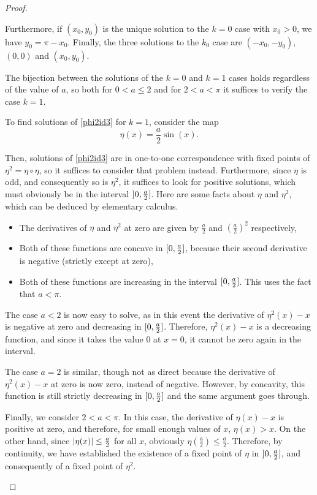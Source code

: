 \begin{proof}
\begin{lemma}
Furthermore, if $(x_0, y_0)$ is the unique solution to the $k=0$ case with $x_0 > 0$, we have $y_0 = \pi - x_0$. Finally, the three solutions to the $k_0$ case are $(-x_0, -y_0)$, $(0,0)$ and $(x_0, y_0)$.
\end{lemma}

\begin{lemmaproof}
The bijection between the solutions of the $k=0$ and $k=1$ cases holds regardless of the value of $a$, so both for $0<a\leq 2$ and for $2<a<\pi$ it suffices to verify the case $k=1$.

To find solutions of \eqref{phi2id3} for $k=1$, consider the map
\begin{equation}
\eta(x) = \frac a 2 \sin(x).
\end{equation}

Then, solutions of \eqref{phi2id3} are in one-to-one correspondence with fixed points of $\eta^2 = \eta \circ \eta$, so it suffices to consider that problem instead. Furthermore, since $\eta$ is odd, and consequently so is $\eta^2$, it suffices to look for positive solutions, which must obviously be in the interval $\linterval 0 {\frac a 2}$. Here are some facts about $\eta$ and $\eta^2$, which can be deduced by elementary calculus.
\begin{itemize}
\item The derivatives of $\eta$ and $\eta^2$ at zero are given by $\frac a 2$ and $\left( \frac a 2 \right)^2$ respectively,
\item Both of these functions are concave in $\interval 0 {\frac a 2}$, because their second derivative is negative (strictly except at zero),
\item Both of these functions are increasing in the interval $\interval 0 {\frac a 2}$. This uses the fact that $a < \pi$.	
\end{itemize}

The case $a < 2$ is now easy to solve, as in this event the derivative of $\eta^2(x) - x$ is negative at zero and decreasing in $\interval 0 {\frac a 2}$. Therefore, $\eta^2(x) - x$ is a decreasing function, and since it takes the value $0$ at $x = 0$, it cannot be zero again in the interval.

The case $a = 2$ is similar, though not as direct because the derivative of $\eta^2(x) - x$ at zero is now zero, instead of negative. However, by concavity, this function is still strictly decreasing in $\interval 0 {\frac a 2}$ and the same argument goes through.

Finally, we consider $2 < a < \pi$. In this case, the derivative of $\eta(x) - x$ is positive at zero, and therefore, for small enough values of $x$, $\eta(x) > x$. On the other hand, since $\lvert\eta(x)\rvert \leq \frac a 2$ for all $x$, obviously $\eta(\frac a 2) \leq \frac a 2$. Therefore, by continuity, we have established the existence of a fixed point of $\eta$ in $\linterval 0 {\frac a 2}$, and consequently of a fixed point of $\eta^2$.


\end{lemmaproof}
\end{proof}
